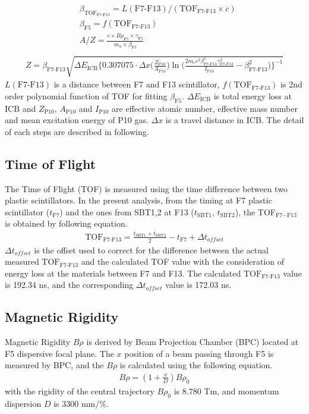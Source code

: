 \begin{align}
    &\beta_{\text{TOF}_{\text{F7-F13}}} = L(\text{F7-F13}) / ( {\text{TOF}}_{\text{F7-F13}} \times c )\\
    &\beta_{\text{F5}} = f(\text{TOF}_{\text{F7-F13}})\\
    &A/Z = \frac{c \times B\rho_{\text{F5}} \times \gamma_{\text{F5}} }{ m_u \times \beta_{\text{F5}}} \label{eq:az}\\
\end{align}
\begin{align}
    Z = \beta_{\text{F7-F13}} \sqrt{\Delta E_{\text{ICB}} \bigg\{ 0.307075 \cdot \Delta x \bigg(\frac{Z_{\text{P10}}}{A_{\text{P10}}}\bigg) \ln \bigg( \frac{2m_{e}c^{2}\beta_{\text{F7-F13}}^{2}\gamma_{\text{F7-F13}}^{2}}{I_{\text{P10}}} - \beta_{\text{F7-F13}}^{2}\bigg) \bigg\}^{-1} }
\end{align}
$L(\text{F7-F13})$ is a distance between F7 and F13 scintillator, $f(\text{TOF}_{\text{F7-F13}})$ is 2nd order polynomial function of TOF for fitting $\beta_{\text{F5}}$. $\Delta E_{\text{ICB}}$ is total energy loss at ICB and $Z_{\text{P10}}$, $A_{\text{P10}}$ and $I_{\text{P10}}$ are effective atomic number, effective mass number and mean excitation energy of P10 gas. $\Delta x$ is a travel distance in ICB. The detail of each steps are described in following.

\subsection{Time of Flight}
The Time of Flight (TOF) is measured using the time difference between two plastic scintillators. In the present analysis, from the timing at F7 plastic scintillator ($t_{\text{F7}}$) and the ones from SBT1,2 at F13 ($t_{\text{SBT1}}$, $t_{\text{SBT2}}$), the TOF$_{\text{F7}-\text{F13}}$ is obtained by following equation.
    \begin{align}
        \text{TOF}_{\text{F7-F13}} = \frac{t_{\text{SBT1}} + t_{\text{SBT2}}}{2} - t_{\text{F7}} + \Delta t_{offset}
    \end{align}
$\Delta t_{offset}$ is the offset used to correct for the difference between the actual measured $\text{TOF}_{\text{F7-F13}}$ and the calculated TOF value with the consideration of energy loss at the materials between F7 and F13. The calculated $\text{TOF}_{\text{F7-F13}}$ value is 192.34 ns, and the corresponding $\Delta t_{offset}$ value is 172.03 ns.

\subsection{Magnetic Rigidity}
Magnetic Rigidity $B\rho$ is derived by Beam Projection Chamber (BPC) located at F5 dispersive focal plane. The $x$ position of a beam passing through F5 is measured by BPC, and the $B\rho$ is calculated using the following equation.
    \begin{align}
        B\rho = (1+\frac{x}{D}) B\rho_{0} \label{eq:brho}
    \end{align}
with the rigidity of the central trajectory $B\rho_{0}$ is 8.780 Tm, and  momentum dispersion $D$ is 3300 mm/$\%$. 

